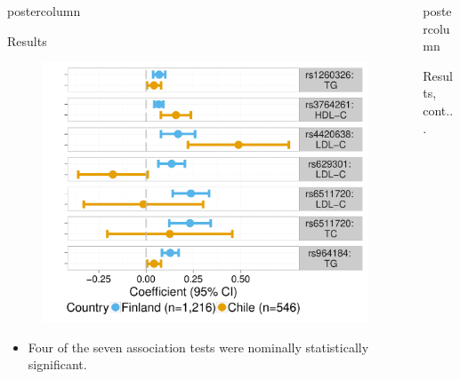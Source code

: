 \documentclass[final]{beamer}\usepackage[]{graphicx}\usepackage[]{color}
\makeatletter
\def\maxwidth{ %
  \ifdim\Gin@nat@width>\linewidth
    \linewidth
  \else
    \Gin@nat@width
  \fi
}
\newlength{\twocolwid}
\newlength{\threecolwid}
\makeatother
\begin{document}
\begin{frame}[t]
\begin{columns}[T]
\begin{column}{\twocolwid}
\begin{beamercolorbox}[center,wd=\textwidth]{postercolumn}
\begin{block}{Results}
\begin{figure}
\includegraphics[width=\maxwidth]{figure/fig-assoc-2-poster-1} 

        \end{figure}
        
            \begin{itemize}\large
            \item \raggedright Four of the seven association tests were nominally statistically significant.
              \end{itemize}



        \end{block}

\end{beamercolorbox}
\end{column}




\begin{column}{\threecolwid}
\begin{beamercolorbox}[center,wd=\textwidth]{postercolumn}


        \vfill

        \begin{block}{Results, cont...}
        

\end{block}
\end{beamercolorbox}
\end{column}
\end{columns}
\end{frame}
\end{document}
